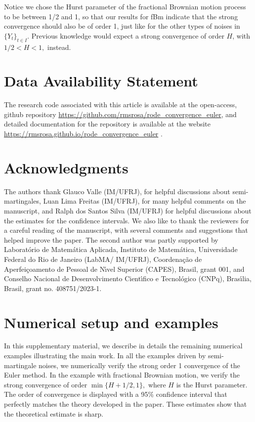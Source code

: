 \documentclass[reqno,12pt]{amsart}
\theoremstyle{plain} %
\theoremstyle{definition} %
\begin{document}
Notice we chose the Hurst parameter of the fractional Brownian motion process to be between 1/2 and 1, so that our results for fBm indicate that the strong convergence should also be of order 1, just like for the other types of noises in $\{Y_t\}_{t\in I}$. Previous knowledge would expect a strong convergence of order $H$, with $1/2 < H < 1,$ instead.

\section*{Data Availability Statement}

The research code associated with this article is available at the open-access, github repository \url{https://github.com/rmsrosa/rode_convergence_euler}, and detailed documentation for the repository is available at the website \url{https://rmsrosa.github.io/rode_convergence_euler} \cite{RODEConvEM2023}.

\section*{Acknowledgments}

The authors thank Glauco Valle (IM/UFRJ), for helpful discussions about semi-martingales, Luan Lima Freitas (IM/UFRJ), for many helpful comments on the manuscript, and Ralph dos Santos Silva (IM/UFRJ) for helpful discussions about the estimates for the confidence intervals. We also like to thank the reviewers for a careful reading of the manuscript, with several comments and suggestions that helped improve the paper. The second author was partly supported by Laborat\'orio de Matem\'atica Aplicada, Instituto de Matem\'atica, Universidade Federal do Rio de Janeiro (LabMA/ IM/UFRJ), Coordena\c{c}\~ao de Aperfei\c{c}oamento de Pessoal de N\'{\i}vel Superior (CAPES), Brasil, grant 001, and Conselho Nacional de Desenvolvimento Cient\'{\i}fico e Tecnol\'ogico (CNPq), Bras\'{\i}lia, Brasil, grant no. 408751/2023-1.

\appendix

\section{Numerical setup and examples}
\label{secsupplementary}

In this supplementary material, we describe in details the remaining numerical examples illustrating the main work. In all the examples driven by semi-martingale noises, we numerically verify the strong order 1 convergence of the Euler method. In the example with fractional Brownian motion, we verify the strong convergence of order $\min\{H+1/2, 1\},$ where $H$ is the Hurst parameter. The order of convergence is displayed with a 95\% confidence interval that perfectly matches the theory developed in the paper. These estimates show that the theoretical estimate is sharp.
\end{document}
